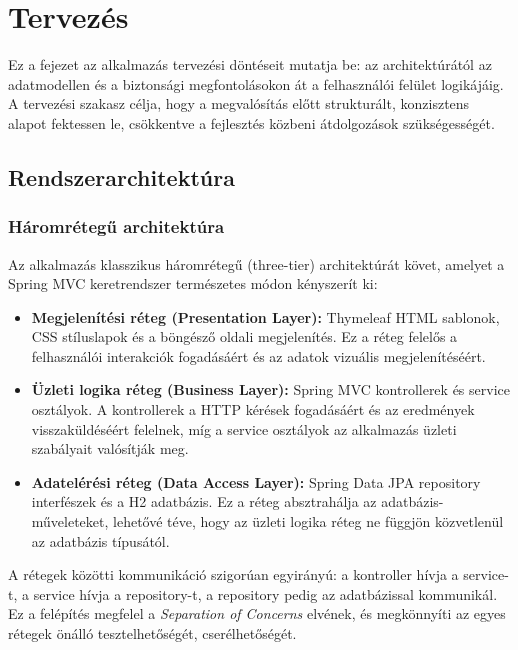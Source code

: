 \chapter{Tervezés}

Ez a fejezet az alkalmazás tervezési döntéseit mutatja be: az architektúrától az adatmodellen és a biztonsági megfontolásokon át a felhasználói felület logikájáig. A tervezési szakasz célja, hogy a megvalósítás előtt strukturált, konzisztens alapot fektessen le, csökkentve a fejlesztés közbeni átdolgozások szükségességét.

\section{Rendszerarchitektúra}

\subsection{Háromrétegű architektúra}

Az alkalmazás klasszikus háromrétegű (three-tier) architektúrát követ, amelyet a Spring MVC keretrendszer természetes módon kényszerít ki:

\begin{itemize}
    \item \textbf{Megjelenítési réteg (Presentation Layer):} Thymeleaf HTML sablonok, CSS stíluslapok és a böngésző oldali megjelenítés. Ez a réteg felelős a felhasználói interakciók fogadásáért és az adatok vizuális megjelenítéséért.
    \item \textbf{Üzleti logika réteg (Business Layer):} Spring MVC kontrollerek és service osztályok. A kontrollerek a HTTP kérések fogadásáért és az eredmények visszaküldéséért felelnek, míg a service osztályok az alkalmazás üzleti szabályait valósítják meg.
    \item \textbf{Adatelérési réteg (Data Access Layer):} Spring Data JPA repository interfészek és a H2 adatbázis. Ez a réteg absztrahálja az adatbázis-műveleteket, lehetővé téve, hogy az üzleti logika réteg ne függjön közvetlenül az adatbázis típusától.
\end{itemize}

A rétegek közötti kommunikáció szigorúan egyirányú: a kontroller hívja a service-t, a service hívja a repository-t, a repository pedig az adatbázissal kommunikál. Ez a felépítés megfelel a \textit{Separation of Concerns} elvének, és megkönnyíti az egyes rétegek önálló tesztelhetőségét, cserélhetőségét.

